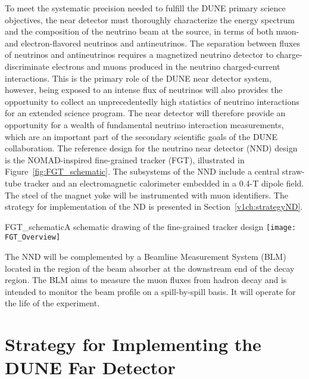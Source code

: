 To meet the systematic precision needed to fulfill the DUNE primary science objectives, the near detector must thoroughly 
characterize the energy spectrum and the composition of the neutrino beam at the source, in terms of
both muon- and electron-flavored neutrinos and antineutrinos. 
The separation between fluxes of neutrinos and antineutrinos requires a magnetized neutrino detector to 
charge-discriminate electrons and muons produced in the neutrino charged-current interactions.
%
This is the primary role of the DUNE near detector system, however, being exposed to an intense flux of neutrinos
will also provides the opportunity to collect an unprecedentedly high statistics of neutrino 
interactions  for an extended science program. 
The near detector will therefore provide an opportunity for a wealth of fundamental neutrino interaction 
measurements, which are an important part of the secondary scientific goals of the DUNE collaboration. 
%
The reference design for the neutrino near detector (NND) design is the NOMAD-inspired fine-grained tracker (FGT), illustrated in Figure~\ref{fig:FGT_schematic}. The subsystems of the NND include a central 
straw-tube tracker and an electromagnetic calorimeter embedded in a 0.4-T dipole field. The steel of the
magnet yoke will be instrumented with muon identifiers. The strategy for implementation of
the ND is presented in Section~\ref{v1ch:strategyND}.

\begin{cdrfigure}{FGT_schematic}{A schematic drawing of the fine-grained tracker design}
\texttt{[image: FGT\_Overview]}
\end{cdrfigure}


The NND will be complemented by a Beamline Measurement System (BLM) located in the region of the beam absorber at the downstream end of the decay region. The BLM aims to measure the muon fluxes from hadron decay and
 is intended to monitor the beam profile on a spill-by-spill basis. It will operate for the life of the experiment.


\section{Strategy for Implementing the DUNE Far Detector}




